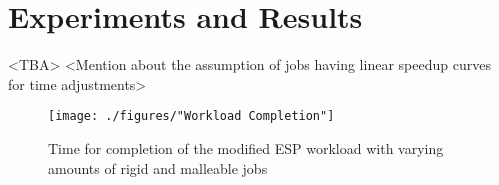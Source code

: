 \section{Experiments and Results}
<TBA>
<Mention about the assumption of jobs having linear speedup curves for time adjustments>
\begin{figure}[!htbp]
\centering
\hspace*{-0.75in}
\texttt{[image: ./figures/"Workload Completion"]}
\caption{Time for completion of the modified ESP workload with varying amounts of rigid and malleable jobs}
\label{fig:2}
\end{figure}

